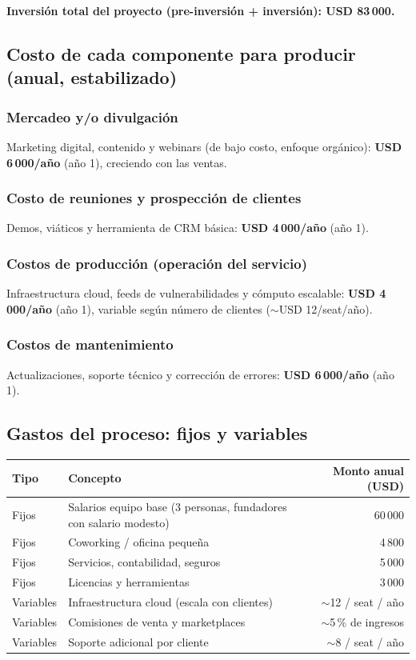 \noindent\textbf{Inversión total del proyecto (pre-inversión + inversión):
USD 83\,000.}

\subsection{Costo de cada componente para producir (anual, estabilizado)}

\subsubsection{Mercadeo y/o divulgación}
Marketing digital, contenido y webinars (de bajo costo, enfoque orgánico):
\textbf{USD 6\,000/año} (año 1), creciendo con las ventas.

\subsubsection{Costo de reuniones y prospección de clientes}
Demos, viáticos y herramienta de CRM básica: \textbf{USD 4\,000/año} (año 1).

\subsubsection{Costos de producción (operación del servicio)}
Infraestructura cloud, feeds de vulnerabilidades y cómputo escalable:
\textbf{USD 4\,000/año} (año 1), variable según número de clientes
($\sim$USD 12/seat/año).

\subsubsection{Costos de mantenimiento}
Actualizaciones, soporte técnico y corrección de errores: \textbf{USD 6\,000/año}
(año 1).

\subsection{Gastos del proceso: fijos y variables}

\begin{table}[ht]
  \centering
  \begin{tabularx}{\linewidth}{l Y r}
    \toprule
    \textbf{Tipo} & \textbf{Concepto} & \textbf{Monto anual (USD)} \\
    \midrule
    Fijos     & Salarios equipo base (3 personas, fundadores con salario modesto) & 60\,000 \\
    Fijos     & Coworking / oficina pequeña & 4\,800 \\
    Fijos     & Servicios, contabilidad, seguros & 5\,000 \\
    Fijos     & Licencias y herramientas & 3\,000 \\
    Variables & Infraestructura cloud (escala con clientes) & $\sim$12 / seat / año \\
    Variables & Comisiones de venta y marketplaces & $\sim$5\,\% de ingresos \\
    Variables & Soporte adicional por cliente & $\sim$8 / seat / año \\
    \bottomrule
  \end{tabularx}
\end{table}

